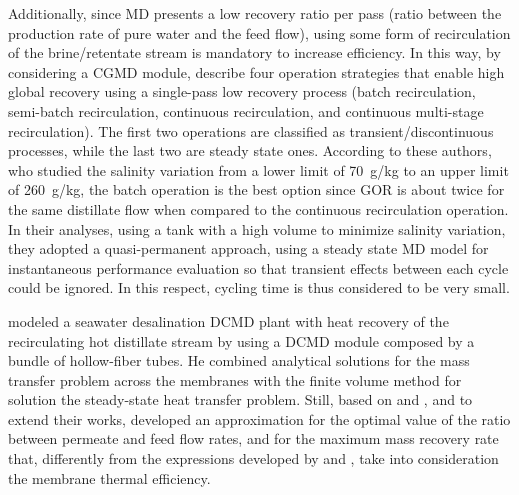 \documentclass[14pt,letterpaper,fleqn]{extarticle}
\begin{document}
Additionally, since MD presents a low recovery ratio per pass (ratio between the
production rate of pure water and the feed flow), using some form of recirculation of
the brine/retentate stream is mandatory to increase efficiency. In this way, by
considering a CGMD module, \citet{SwaminathanLienhard2018} describe four operation
strategies that enable high global recovery using a single-pass low recovery process
(batch recirculation, semi-batch recirculation, continuous recirculation, and continuous
multi-stage recirculation). The first two operations are classified as
transient/discontinuous processes, while the last two are steady state ones. According
to these authors, who studied the salinity variation from a lower limit of 70~g/kg to an
upper limit of 260~g/kg, the batch operation is the best option since GOR is about twice
for the same distillate flow when compared to the continuous recirculation operation.
In their analyses, using a tank with a high volume to minimize salinity variation, they
adopted a quasi-permanent approach, using a steady state MD model for instantaneous
performance evaluation so that transient effects between each cycle could be ignored. In
this respect, cycling time is thus considered to be very small.

\citet{Sampaio2022} modeled a seawater desalination DCMD plant with heat recovery of
the recirculating hot distillate stream by using a DCMD module composed by a bundle of
hollow-fiber tubes. He combined analytical solutions for the mass transfer problem
across the membranes with the finite volume method for solution the steady-state heat
transfer problem. Still, based on \citet{Christie2020} and \citet{Lin2014}, and to
extend their works, \citet{Sampaio2022} developed an approximation for the optimal
value of the ratio between permeate and feed flow rates, and for the maximum mass
recovery rate that, differently from the expressions developed by \citet{Christie2020}
and \citet{Lin2014}, take into consideration the membrane thermal efficiency.
\end{document}
